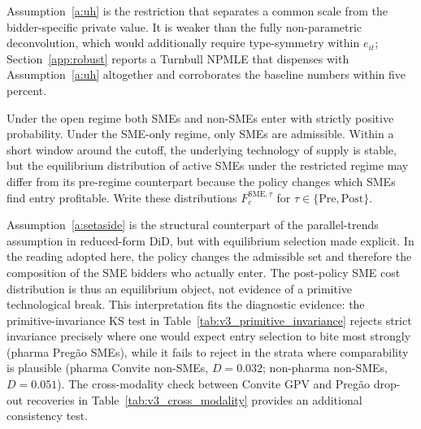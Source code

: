 Assumption~\ref{a:uh} is the \citet{krasnokutskaya2011} restriction that separates a common scale from the bidder-specific private value. It is weaker than the fully non-parametric \citet{kotlarski1967} deconvolution, which would additionally require type-symmetry within $e_{it}$; Section~\ref{app:robust} reports a Turnbull NPMLE that dispenses with Assumption~\ref{a:uh} altogether and corroborates the baseline numbers within five percent.

\begin{assumption}\label{a:setaside}
Under the open regime both SMEs and non-SMEs enter with strictly positive probability. Under the SME-only regime, only SMEs are admissible. Within a short window around the cutoff, the underlying technology of supply is stable, but the equilibrium distribution of active SMEs under the restricted regime may differ from its pre-regime counterpart because the policy changes which SMEs find entry profitable. Write these distributions $F_c^{\mathrm{SME},\tau}$ for $\tau \in \{\mathrm{Pre},\mathrm{Post}\}$.
\end{assumption}

Assumption~\ref{a:setaside} is the structural counterpart of the parallel-trends assumption in reduced-form DiD, but with equilibrium selection made explicit. In the \citet{atheyseira2011} reading adopted here, the policy changes the admissible set and therefore the composition of the SME bidders who actually enter. The post-policy SME cost distribution is thus an equilibrium object, not evidence of a primitive technological break. This interpretation fits the diagnostic evidence: the primitive-invariance KS test in Table~\ref{tab:v3_primitive_invariance} rejects strict invariance precisely where one would expect entry selection to bite most strongly (pharma Preg\~ao SMEs), while it fails to reject in the strata where comparability is plausible (pharma Convite non-SMEs, $D = 0.032$; non-pharma non-SMEs, $D = 0.051$). The cross-modality check between Convite GPV and Preg\~ao drop-out recoveries in Table~\ref{tab:v3_cross_modality} provides an additional consistency test.

